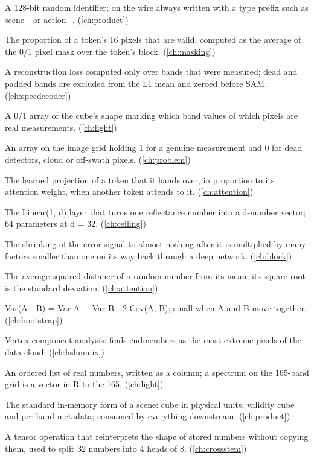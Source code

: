 \begin{description}[style=nextline,leftmargin=1.2em,font=\normalfont\bfseries]
\item[UUID] A 128-bit random identifier; on the wire always written with a type prefix such as scene\_ or action\_. (\cref{ch:product})
\item[Valid fraction] The proportion of a token's 16 pixels that are valid, computed as the average of the 0/1 pixel mask over the token's block. (\cref{ch:masking})
\item[Valid-band loss] A reconstruction loss computed only over bands that were measured; dead and padded bands are excluded from the L1 mean and zeroed before SAM. (\cref{ch:specdecoder})
\item[Validity cube] A 0/1 array of the cube's shape marking which band values of which pixels are real measurements. (\cref{ch:light})
\item[Validity mask] An array on the image grid holding 1 for a genuine measurement and 0 for dead detectors, cloud or off-swath pixels. (\cref{ch:problem})
\item[Value] The learned projection of a token that it hands over, in proportion to its attention weight, when another token attends to it. (\cref{ch:attention})
\item[Value stretch] The Linear(1, d) layer that turns one reflectance number into a d-number vector; 64 parameters at d = 32. (\cref{ch:ceiling})
\item[Vanishing gradient] The shrinking of the error signal to almost nothing after it is multiplied by many factors smaller than one on its way back through a deep network. (\cref{ch:block})
\item[Variance] The average squared distance of a random number from its mean; its square root is the standard deviation. (\cref{ch:attention})
\item[Variance of a difference] Var(A - B) = Var A + Var B - 2 Cov(A, B); small when A and B move together. (\cref{ch:bootstrap})
\item[VCA] Vertex component analysis: finds endmembers as the most extreme pixels of the data cloud. (\cref{ch:hslunmix})
\item[Vector] An ordered list of real numbers, written as a column; a spectrum on the 165-band grid is a vector in R to the 165. (\cref{ch:light})
\item[Vendable] The standard in-memory form of a scene: cube in physical units, validity cube and per-band metadata; consumed by everything downstream. (\cref{ch:product})
\item[View] A tensor operation that reinterprets the shape of stored numbers without copying them, used to split 32 numbers into 4 heads of 8. (\cref{ch:crossstem})

\end{description}
